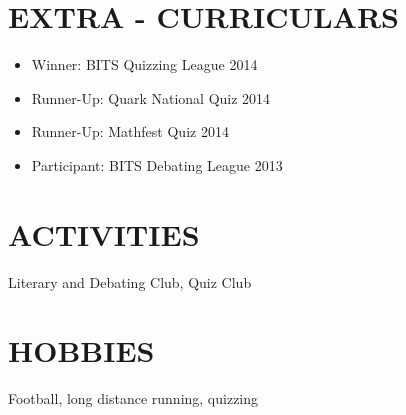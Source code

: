 \documentclass[margin]{res}
\begin{document}
\begin{resume}
\section{EXTRA - CURRICULARS}
		\begin{itemize}
			\item Winner: BITS Quizzing League 2014
			\item Runner-Up: Quark National Quiz 2014
			\item Runner-Up: Mathfest Quiz 2014
			\item Participant: BITS Debating League 2013
		\end{itemize}
\section{ACTIVITIES}
                Literary and Debating Club, Quiz Club
                

 
\section{HOBBIES}         Football, long distance running, quizzing
 
\end{resume} 
\end{document}
